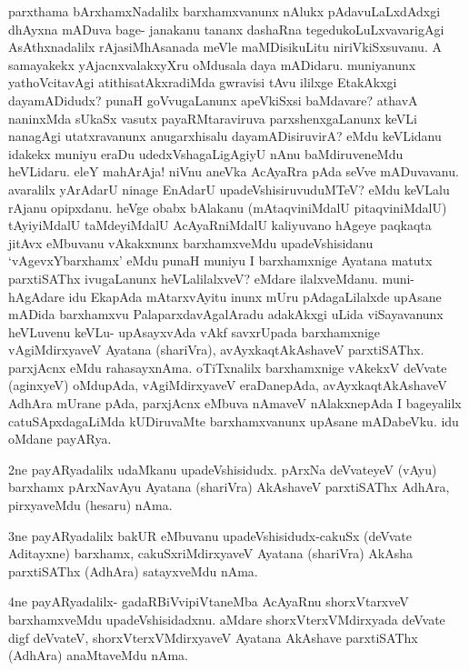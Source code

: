 \begin{artha}
parxthama bArxhamxNadalilx barxhamxvanunx nAlukx pAdavuLaLxdAdxgi dhAyxna mADuva bage- janakanu tananx dashaRna tegedukoLuLxvavarigAgi AsAthxnadalilx rAjasiMhAsanada meVle maMDisikuLitu niriVkiSxsuvanu. A samayakekx yAjacnxvalakxyXru oMdusala daya mADidaru. muniyanunx yathoVcitavAgi atithisatAkxradiMda gwravisi tAvu ililxge EtakAkxgi dayamADidudx? punaH goVvugaLanunx apeVkiSxsi baMdavare? athavA naninxMda sUkaSx vasutx payaRMtaraviruva parxshenxgaLanunx keVLi nanagAgi utatxravanunx anugarxhisalu dayamADisiruvirA? eMdu keVLidanu idakekx muniyu eraDu udedxVshagaLigAgiyU nAnu baMdiruveneMdu heVLidaru. eleY mahArAja! niVnu aneVka AcAyaRra pAda seVve mADuvavanu. avaralilx yArAdarU ninage EnAdarU upadeVshisiruvuduMTeV? eMdu keVLalu rAjanu opipxdanu. heVge obabx bAlakanu (mAtaqviniMdalU pitaqviniMdalU) tAyiyiMdalU taMdeyiMdalU AcAyaRniMdalU kaliyuvano hAgeye paqkaqta jitAvx eMbuvanu vAkakxnunx barxhamxveMdu upadeVshisidanu `vAgevxYbarxhamx' eMdu punaH muniyu I barxhamxnige Ayatana matutx parxtiSAThx ivugaLanunx heVLalilalxveV? eMdare ilalxveMdanu. muni-hAgAdare idu EkapAda mAtarxvAyitu inunx mUru pAdagaLilalxde upAsane mADida barxhamxvu PalaparxdavAgalAradu adakAkxgi uLida viSayavanunx heVLuvenu keVLu- upAsayxvAda vAkf savxrUpada barxhamxnige vAgiMdirxyaveV Ayatana (shariVra), avAyxkaqtAkAshaveV parxtiSAThx. parxjAcnx eMdu rahasayxnAma. oTiTxnalilx barxhamxnige vAkekxV deVvate (aginxyeV) oMdupAda, vAgiMdirxyaveV eraDanepAda, avAyxkaqtAkAshaveV AdhAra mUrane pAda, parxjAcnx eMbuva nAmaveV nAlakxnepAda I bageyalilx catuSApxdagaLiMda kUDiruvaMte barxhamxvanunx upAsane mADabeVku. idu oMdane payARya. 
\end{artha}

\begin{artha}
2ne payARyadalilx udaMkanu upadeVshisidudx. pArxNa deVvateyeV (vAyu) barxhamx pArxNavAyu Ayatana (shariVra) AkAshaveV parxtiSAThx AdhAra, pirxyaveMdu (hesaru) nAma.
\end{artha}

\begin{artha}
3ne payARyadalilx bakUR eMbuvanu upadeVshisidudx-cakuSx (deVvate Aditayxne) barxhamx, cakuSxriMdirxyaveV Ayatana (shariVra) AkAsha parxtiSAThx (AdhAra) satayxveMdu nAma.
\end{artha}

\begin{artha}%
4ne payARyadalilx- gadaRBiVvipiVtaneMba AcAyaRnu shorxVtarxveV barxhamxveMdu upadeVshisidadxnu. aMdare shorxVterxVMdirxyada deVvate digf deVvateV, shorxVterxVMdirxyaveV Ayatana AkAshave parxtiSAThx (AdhAra) anaMtaveMdu nAma. 
\end{artha}

